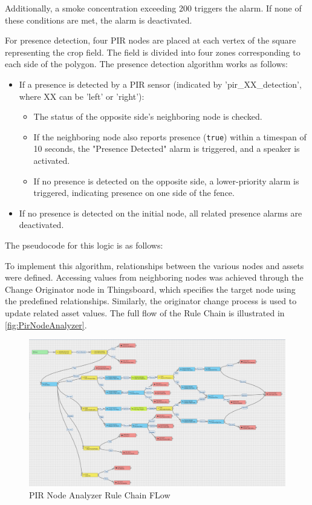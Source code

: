 Additionally, a smoke concentration exceeding 200  triggers the alarm. If none of these conditions are met, the alarm is deactivated.

For presence detection, four PIR nodes are placed at each vertex of the square representing the crop field. The field is divided into four zones corresponding to each side 
of the polygon. The presence detection algorithm works as follows:
\begin{itemize}
    \item If a presence is detected by a PIR sensor (indicated by 'pir\_XX\_detection', where XX can be 'left' or 'right'):
    \begin{itemize}
        \item The status of the opposite side’s neighboring node is checked.
        \item If the neighboring node also reports presence (\texttt{true}) within a timespan of 10 seconds, the "Presence Detected" alarm is triggered, and a speaker is activated.
        \item If no presence is detected on the opposite side, a lower-priority alarm is triggered, indicating presence on one side of the fence.
    \end{itemize}
    \item If no presence is detected on the initial node, all related presence alarms are deactivated. 
\end{itemize}

The pseudocode for this logic is as follows:


To implement this algorithm, relationships between the various nodes and assets were defined. Accessing values from neighboring nodes was achieved through the Change
Originator node in Thingsboard, which specifies the target node using the predefined relationships. Similarly, the originator change process is used to update related 
asset values. The full flow of the Rule Chain is illustrated in \autoref{fig:PirNodeAnalyzer}.

\begin{figure}[H]
    \centering
    \includegraphics[width=1.4\textwidth,angle=90]{./images/8/PirNodeAnalyzer.PNG}
    \caption{PIR Node Analyzer Rule Chain FLow}
    \label{fig:PirNodeAnalyzer}
\end{figure}

